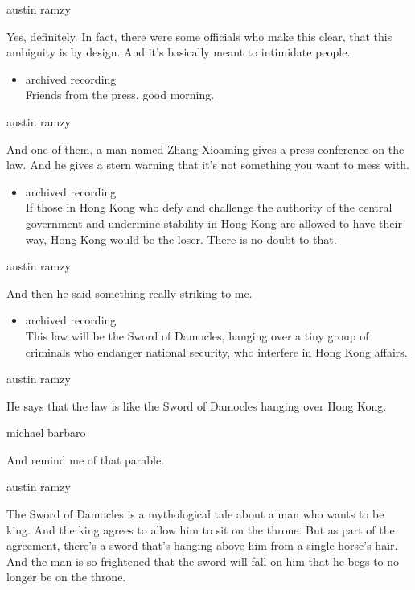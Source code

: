 austin ramzy

Yes, definitely. In fact, there were some officials who make this clear,
that this ambiguity is by design. And it's basically meant to intimidate
people.

\begin{itemize}
\tightlist
\item
  archived recording\\
  Friends from the press, good morning.
\end{itemize}

austin ramzy

And one of them, a man named Zhang Xioaming gives a press conference on
the law. And he gives a stern warning that it's not something you want
to mess with.

\begin{itemize}
\tightlist
\item
  archived recording\\
  If those in Hong Kong who defy and challenge the authority of the
  central government and undermine stability in Hong Kong are allowed to
  have their way, Hong Kong would be the loser. There is no doubt to
  that.
\end{itemize}

austin ramzy

And then he said something really striking to me.

\begin{itemize}
\tightlist
\item
  archived recording\\
  This law will be the Sword of Damocles, hanging over a tiny group of
  criminals who endanger national security, who interfere in Hong Kong
  affairs.
\end{itemize}

austin ramzy

He says that the law is like the Sword of Damocles hanging over Hong
Kong.

michael barbaro

And remind me of that parable.

austin ramzy

The Sword of Damocles is a mythological tale about a man who wants to be
king. And the king agrees to allow him to sit on the throne. But as part
of the agreement, there's a sword that's hanging above him from a single
horse's hair. And the man is so frightened that the sword will fall on
him that he begs to no longer be on the throne.

